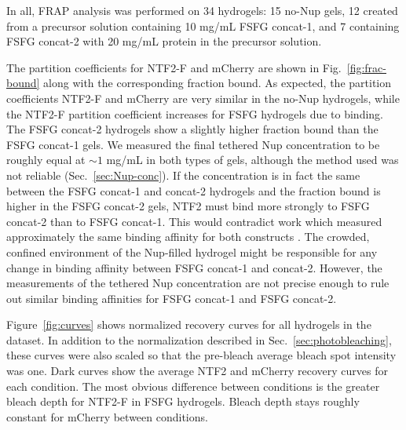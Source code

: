 In all, FRAP analysis was performed on 34 hydrogels: 15 no-Nup gels, 12 created from a precursor solution containing 10 mg/mL FSFG concat-1, and 7 containing FSFG concat-2 with 20 mg/mL protein in the precursor solution. %

The partition coefficients for NTF2-F and mCherry are shown in Fig.~\ref{fig:frac-bound} along with the corresponding fraction bound.  As expected, the partition coefficients NTF2-F and mCherry are very similar in the no-Nup hydrogels, while the NTF2-F partition coefficient increases for FSFG hydrogels due to binding.  The FSFG concat-2 hydrogels show a slightly higher fraction bound than the FSFG concat-1 gels.  We measured the final tethered Nup concentration to be roughly equal  at $\sim 1$ mg/mL in both types of gels, although the method used was not reliable (Sec.~\ref{sec:Nup-conc}).  If the concentration is in fact the same between the FSFG concat-1 and concat-2 hydrogels and the fraction bound is higher in the FSFG concat-2 gels, NTF2 must bind more strongly to FSFG concat-2 than to FSFG concat-1.  This would contradict work which measured approximately the same binding affinity for both constructs \cite{hayama18}.  The crowded, confined environment of the Nup-filled hydrogel might be responsible for any change in binding affinity between FSFG concat-1 and concat-2.  However, the measurements of the tethered Nup concentration are not precise enough to rule out similar binding affinities for FSFG concat-1 and FSFG concat-2.



Figure~\ref{fig:curves} shows normalized recovery curves for all hydrogels in the dataset.  In addition to the normalization described in Sec.~\ref{sec:photobleaching}, these curves were also scaled so that the pre-bleach average bleach spot intensity was one.  Dark curves show the average NTF2 and mCherry recovery curves for each condition.  The most obvious difference between conditions is the greater bleach depth for NTF2-F in FSFG hydrogels.  Bleach depth stays roughly constant for mCherry between conditions.

